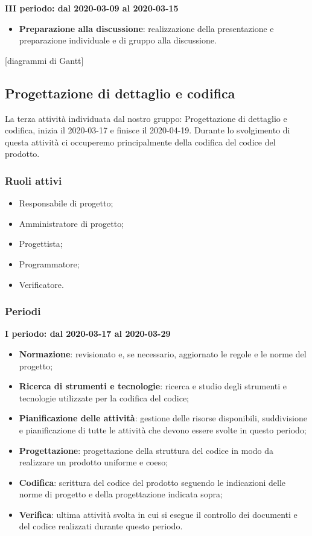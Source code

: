 \textbf{III periodo: dal 2020-03-09 al 2020-03-15}
\begin{itemize}
	\item \textbf{Preparazione alla discussione}: realizzazione della presentazione e preparazione individuale e di gruppo alla discussione.
\end{itemize}

[diagrammi di Gantt]

\subsection{Progettazione di dettaglio e codifica}
La terza attività individuata dal nostro gruppo: Progettazione di dettaglio e codifica, inizia il 2020-03-17 e finisce il 2020-04-19. Durante lo svolgimento di questa attività ci occuperemo principalmente della codifica del codice del prodotto.

\subsubsection{Ruoli attivi}
\begin{itemize}
	\item Responsabile di progetto;
	\item Amministratore di progetto;
	\item Progettista;
	\item Programmatore;
	\item Verificatore.
\end{itemize}

\subsubsection{Periodi}
\textbf{I periodo: dal 2020-03-17 al 2020-03-29}
\begin{itemize}
	\item \textbf{Normazione}: revisionato e, se necessario, aggiornato le regole e le norme del progetto;
	\item \textbf{Ricerca di strumenti e tecnologie}: ricerca e studio degli strumenti e tecnologie utilizzate per la codifica del codice;
	\item \textbf{Pianificazione delle attività}: gestione delle risorse disponibili, suddivisione e pianificazione di tutte le attività che devono essere svolte in questo periodo;
	\item \textbf{Progettazione}: progettazione della struttura del codice in modo da realizzare un prodotto uniforme e coeso;
	\item \textbf{Codifica}: scrittura del codice del prodotto seguendo le indicazioni delle norme di progetto e della progettazione indicata sopra; 
	\item \textbf{Verifica}: ultima attività svolta in cui si esegue il controllo dei documenti e del codice realizzati durante questo periodo.
\end{itemize}

